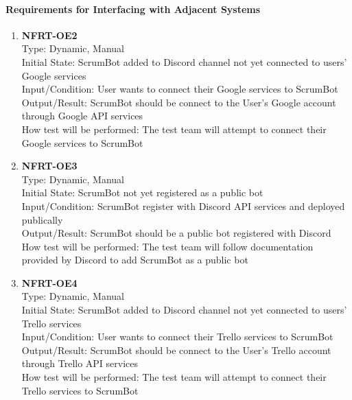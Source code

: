 \documentclass[12pt, titlepage]{article}
\begin{document}
\paragraph{Requirements for Interfacing with Adjacent Systems}
\begin{enumerate}

\item{\textbf{NFRT-OE2}}\\
Type: Dynamic, Manual\\
Initial State: ScrumBot added to Discord channel not yet connected to users' Google services\\
Input/Condition: User wants to connect their Google services to ScrumBot\\
Output/Result: ScrumBot should be connect to the User's Google account through Google API services\\
How test will be performed: The test team will attempt to connect their Google services to ScrumBot

\item{\textbf{NFRT-OE3}}\\
Type: Dynamic, Manual\\
Initial State: ScrumBot not yet registered as a public bot\\
Input/Condition: ScrumBot register with Discord API services and deployed publically\\
Output/Result: ScrumBot should be a public bot registered with Discord\\
How test will be performed: The test team will follow documentation provided by Discord to add ScrumBot as a public bot

\item{\textbf{NFRT-OE4}}\\
Type: Dynamic, Manual\\
Initial State: ScrumBot added to Discord channel not yet connected to users' Trello services\\
Input/Condition: User wants to connect their Trello services to ScrumBot\\
Output/Result: ScrumBot should be connect to the User's Trello account through Trello API services\\
How test will be performed: The test team will attempt to connect their Trello services to ScrumBot
\end{enumerate}
\end{document}
